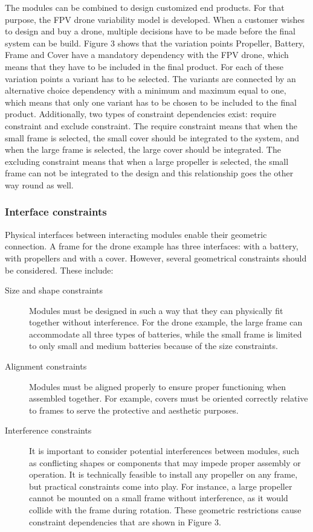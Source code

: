 \documentclass[sigconf,review]{acmart}
\begin{document}
The modules can be combined to design customized end products.  For that purpose, the FPV drone variability model is developed. 
When a customer wishes to design and buy a drone, multiple decisions have to be made before the final system can be build. 
Figure 3 shows that the variation points Propeller, Battery, Frame and Cover have a mandatory dependency with the FPV drone, which means that they have to be included in the final product. 
For each of these variation points a variant has to be selected. The variants are connected by an alternative choice dependency with a minimum and maximum equal to one, which means that only one variant has to be chosen to be included to the final product. 
Additionally, two types of constraint dependencies exist: require constraint and exclude constraint. The require constraint means that when the small frame is selected, the small cover should be integrated to the system, and when the large frame is selected, the large cover should be integrated. 
The excluding constraint means that when a large propeller is selected, the small frame can not be integrated to the design and this relationship goes the other way round as well.

\subsubsection{Interface constraints}

Physical interfaces between interacting modules enable their geometric connection. A frame for the drone example has three interfaces: with a battery, with propellers and with a cover. 
However, several geometrical constraints should be considered. These include:

\begin{description}
    \item[Size and shape constraints] Modules must be designed in such a way that they can physically fit together without interference. 
For the drone example, the large frame can accommodate all three types of batteries, while the small frame is limited to only small and medium batteries because of the size constraints.
    \item[Alignment constraints] Modules must be aligned properly to ensure proper functioning when assembled together. 
For example, covers must be oriented correctly relative to frames to serve the protective and aesthetic purposes. 
    \item[Interference constraints] It is important to consider potential interferences between modules, such as conflicting shapes or components that may impede proper assembly or operation. 
It is technically feasible to install any propeller on any frame, but practical constraints come into play. For instance, a large propeller cannot be mounted on a small frame without interference, as it would collide with the frame during rotation.
These geometric restrictions cause constraint dependencies that are shown in Figure 3.
\end{description}
\end{document}
